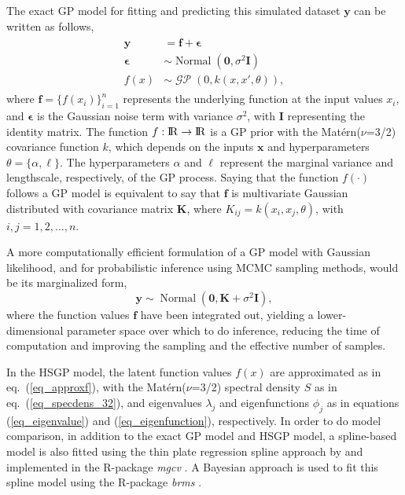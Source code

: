\documentclass[onecolumn,a4paper,11pt]{article}
\DeclareMathOperator{\GP}{\mathcal{GP}}
\DeclareMathOperator{\Normal}{Normal}
\begin{document}
The exact GP model for fitting and predicting this simulated dataset $\bm{y}$ can be written as follows,
%
\begin{align*}\label{ch5_eq_latentgp_simudata1}
\begin{split}
\bm{y} &= \bm{f} + \bm{\epsilon} \\
\bm{\epsilon} &\sim \Normal(\bm{0}, \sigma^2 \bm{I}) \\
f(x) &\sim \GP(0, k(x, x', \theta)),
\end{split}
\end{align*}
%
where $\bm{f}=\{f(x_i)\}_{i=1}^n$ represents the underlying function at the input values $x_i$, and $\bm{\epsilon}$ is the Gaussian noise term with variance $\sigma^2$, with $\bm{I}$ representing the identity matrix. The function $f:{\rm I\!R} \to {\rm I\!R}$ is a GP prior with the Mat{\'e}rn($\nu$=3/2) covariance function $k$, which depends on the inputs $\bm{x}$ and hyperparameters $\theta=\{\alpha,\ell\}$. The hyperparameters $\alpha$ and $\ell$ represent the marginal variance and lengthscale, respectively, of the GP process. Saying that the function $f(\cdot)$ follows a GP model is equivalent to say that $\bm{f}$ is multivariate Gaussian distributed with covariance matrix $\bm{K}$, where $K_{ij}=k(x_i,x_j,\theta)$, with $i,j=1,2,\dots,n$.
 
A more computationally efficient formulation of a GP model with Gaussian likelihood, and for probabilistic inference using MCMC sampling methods, would be its marginalized form,
%
\begin{equation*}\label{ch5_eq_marginalizedgp_simudata1}
\bm{y} \sim \Normal(\bm{0},\bm{K}+ \sigma^2 \bm{I} ),
\end{equation*}
%
where the function values $\bm{f}$ have been integrated out, yielding a lower-dimensional parameter space over which to do inference, reducing the time of computation and improving the sampling and the effective number of samples.

In the HSGP model, the latent function values $f(x)$ are approximated as in eq.~(\ref{eq_approxf}), with the Mat{\'e}rn($\nu$=3/2) spectral density $S$ as in eq.~(\ref{eq_specdens_32}), and eigenvalues $\lambda_j$ and eigenfunctions $\phi_j$ as in equations (\ref{eq_eigenvalue}) and (\ref{eq_eigenfunction}), respectively.  In order to do model comparison, in addition to the exact GP model and HSGP model, a spline-based model is also fitted using the thin plate regression spline approach by \citet{wood2003thin} and implemented in the R-package \textit{mgcv} \citep{wood2011mgcv}. A Bayesian approach is used to fit this spline model using the R-package \textit{brms} \citep{burkner2017brms}.
\end{document}
